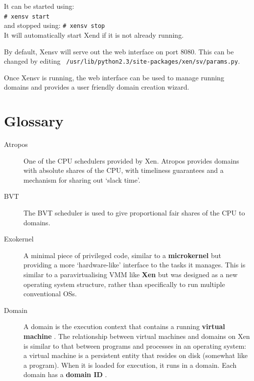 \documentclass[11pt,twoside,final,openright]{xenstyle}
\begin{document}
{It can be started using:\\ \verb_# xensv start_ \\ and
stopped using: \verb_# xensv stop_ \\ It will automatically start Xend
if it is not already running.

By default, Xensv will serve out the web interface on port 8080.  This
can be changed by editing {\tt
/usr/lib/python2.3/site-packages/xen/sv/params.py}.

Once Xensv is running, the web interface can be used to manage running
domains and provides a user friendly domain creation wizard.



\chapter{Glossary}

\begin{description}
\item[Atropos]             One of the CPU schedulers provided by Xen.
                           Atropos provides domains with absolute shares
                           of the CPU, with timeliness guarantees and a
                           mechanism for sharing out `slack time'.

\item[BVT]                 The BVT scheduler is used to give proportional
                           fair shares of the CPU to domains.

\item[Exokernel]           A minimal piece of privileged code, similar to
                           a {\bf microkernel} but providing a more
                           `hardware-like' interface to the tasks it
                           manages.  This is similar to a paravirtualising
                           VMM like {\bf Xen} but was designed as a new
                           operating system structure, rather than
                           specifically to run multiple conventional OSs.

\item[Domain]              A domain is the execution context that
                           contains a running { \bf virtual machine }.
                           The relationship between virtual machines
                           and domains on Xen is similar to that between
                           programs and processes in an operating
                           system: a virtual machine is a persistent
                           entity that resides on disk (somewhat like
                           a program).  When it is loaded for execution,
                           it runs in a domain.  Each domain has a
                           { \bf domain ID }.


\end{description}}
\end{document}
